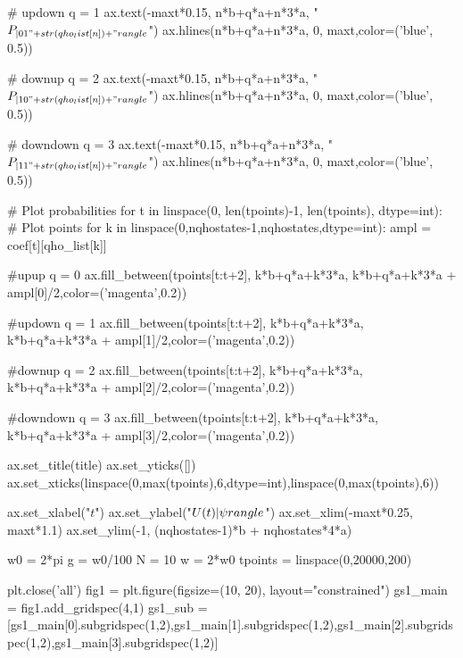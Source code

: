 \begin{python}
        # updown
        q = 1
        ax.text(-maxt*0.15, n*b+q*a+n*3*a, "$P_{|01"+str(qho_list[n])+"\\rangle}$")
        ax.hlines(n*b+q*a+n*3*a, 0, maxt,color=('blue', 0.5))

        # downup
        q = 2
        ax.text(-maxt*0.15, n*b+q*a+n*3*a, "$P_{|10"+str(qho_list[n])+"\\rangle}$")
        ax.hlines(n*b+q*a+n*3*a, 0, maxt,color=('blue', 0.5))

        # downdown
        q = 3
        ax.text(-maxt*0.15, n*b+q*a+n*3*a, "$P_{|11"+str(qho_list[n])+"\\rangle}$")
        ax.hlines(n*b+q*a+n*3*a, 0, maxt,color=('blue', 0.5))

    # Plot probabilities
    for t in linspace(0, len(tpoints)-1, len(tpoints), dtype=int):
        # Plot points
        for k in linspace(0,nqhostates-1,nqhostates,dtype=int):
            ampl = coef[t][qho_list[k]]
            
            #upup
            q = 0
            ax.fill_between(tpoints[t:t+2], k*b+q*a+k*3*a, k*b+q*a+k*3*a + ampl[0]/2,color=('magenta',0.2))
            
            #updown
            q = 1
            ax.fill_between(tpoints[t:t+2], k*b+q*a+k*3*a, k*b+q*a+k*3*a + ampl[1]/2,color=('magenta',0.2))
            
            #downup
            q = 2
            ax.fill_between(tpoints[t:t+2], k*b+q*a+k*3*a, k*b+q*a+k*3*a + ampl[2]/2,color=('magenta',0.2))
            
            #downdown
            q = 3
            ax.fill_between(tpoints[t:t+2], k*b+q*a+k*3*a, k*b+q*a+k*3*a + ampl[3]/2,color=('magenta',0.2))
            
    ax.set_title(title)
    ax.set_yticks([])
    ax.set_xticks(linspace(0,max(tpoints),6,dtype=int),linspace(0,max(tpoints),6))
    
    ax.set_xlabel("$t$")
    ax.set_ylabel("$U(t)| \psi \\rangle$")
    ax.set_xlim(-maxt*0.25, maxt*1.1)
    ax.set_ylim(-1, (nqhostates-1)*b + nqhostates*4*a)
    
w0 = 2*pi
g = w0/100
N = 10
w = 2*w0
tpoints = linspace(0,20000,200)

plt.close('all')
fig1 = plt.figure(figsize=(10, 20), layout="constrained")
gs1_main = fig1.add_gridspec(4,1)
gs1_sub = [gs1_main[0].subgridspec(1,2),gs1_main[1].subgridspec(1,2),gs1_main[2].subgridspec(1,2),gs1_main[3].subgridspec(1,2)]


\end{python}
